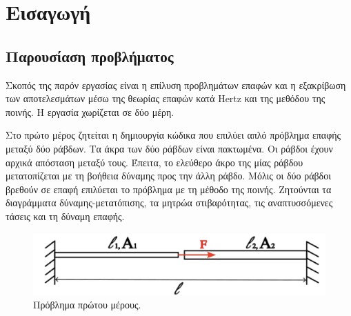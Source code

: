 \documentclass{article}
\begin{document}


\tableofcontents


\section{Εισαγωγή}
\subsection{Παρουσίαση προβλήματος}
Σκοπός της παρόν εργασίας είναι η επίλυση προβλημάτων επαφών και η εξακρίβωση των αποτελεσμάτων μέσω της θεωρίας επαφών κατά Hertz και της μεθόδου της ποινής. Η εργασία χωρίζεται σε δύο μέρη. 
\par Στο πρώτο μέρος ζητείται η δημιουργία κώδικα που επιλύει απλό πρόβλημα επαφής μεταξύ δύο ράβδων. Τα άκρα των δύο ράβδων είναι πακτωμένα. Οι ράβδοι έχουν αρχικά απόσταση μεταξύ τους. Έπειτα, το ελεύθερο άκρο της μίας ράβδου μετατοπίζεται με τη βοήθεια δύναμης προς την άλλη ράβδο. Μόλις οι δύο ράβδοι βρεθούν σε επαφή επιλύεται το πρόβλημα με τη μέθοδο της ποινής. Ζητούνται τα διαγράμματα δύναμης-μετατόπισης, τα μητρώα στιβαρότητας, τις αναπτυσσόμενες τάσεις και τη δύναμη επαφής.

\begin{figure}[H]
    \centering
    \includegraphics[width=0.6\linewidth]{media/merosA.png}
    \caption{Πρόβλημα πρώτου μέρους.}
    \label{fig:merosA}
\end{figure}
\end{document}
